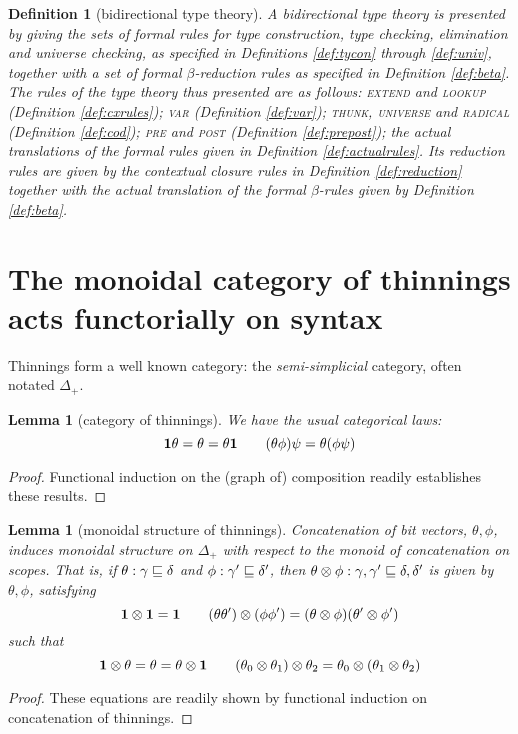 \documentclass{jfp1}
\newtheorem{lemma}[theorem]{Lemma}
\newtheorem{definition}[theorem]{Definition}
\begin{document}
\begin{definition}[bidirectional type theory]
  A bidirectional type theory is presented by giving the sets of formal
  rules for type construction, type checking, elimination and universe
  checking, as specified in Definitions \ref{def:tycon} through
  \ref{def:univ}, together with a set of formal $\beta$-reduction rules as
  specified in Definition \ref{def:beta}. The rules of the type theory thus presented
  are as follows: \textsc{extend} and \textsc{lookup} (Definition
  \ref{def:cxrules});
  \textsc{var} (Definition \ref{def:var});
  \textsc{thunk}, \textsc{universe} and \textsc{radical} (Definition
  \ref{def:cod});
  \textsc{pre} and \textsc{post} (Definition \ref{def:prepost});
  the actual translations of the formal rules given in Definition
  \ref{def:actualrules}.
  Its reduction rules are given by the contextual closure rules in
  Definition \ref{def:reduction} together with the actual translation
  of the formal $\beta$-rules given by Definition \ref{def:beta}.
\end{definition}


\section{The monoidal category of thinnings acts functorially on syntax\label{sec:thincat}}

Thinnings form a well known category: the \emph{semi-simplicial} category, often notated $\Delta_+$.


\begin{lemma}[category of thinnings]
  We have the usual categorical laws:
  \[
    \mathbf{1}\theta = \theta = \theta\mathbf{1} \qquad
    (\theta\phi)\psi = \theta(\phi\psi)
    \]
\end{lemma}
\begin{proof}
  Functional induction on the (graph of) composition readily establishes these results.
\end{proof}

\begin{lemma}[monoidal structure of thinnings]
  Concatenation of bit vectors, $\theta,\phi$, induces monoidal
  structure on $\Delta_+$ with respect to the monoid of concatenation
  on scopes. That is, if $\theta:\gamma\sqsubseteq\delta$ and
  $\phi:\gamma'\sqsubseteq\delta'$, then $\theta\otimes\phi :
  \gamma,\gamma'\sqsubseteq\delta,\delta'$
  is given by $\theta,\phi$, satisfying
  \[
    \mathbf{1}\otimes\mathbf{1} = \mathbf{1} \qquad
    (\theta\theta')\otimes(\phi\phi') =
     (\theta\otimes\phi)(\theta'\otimes\phi')
   \]
   such that
   \[
     \mathbf{1}\otimes\theta = \theta = \theta\otimes\mathbf{1}\qquad
     (\theta_0\otimes\theta_1)\otimes\theta_2 = \theta_0\otimes(\theta_1\otimes\theta_2)
   \]
\end{lemma}
\begin{proof}
  These equations are readily shown by functional induction on
  concatenation of thinnings.
\end{proof}
\end{document}
